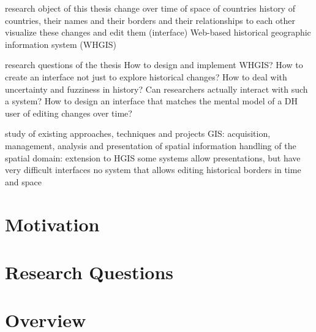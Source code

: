 research object of this thesis
  change over time of space of countries
  history of countries, their names and their borders and their relationships to each other
  visualize these changes and edit them (interface)
  Web-based historical geographic information system (WHGIS)

research questions of the thesis
  How to design and implement WHGIS?
  How to create an interface not just to explore historical changes?
  How to deal with uncertainty and fuzziness in history?
  Can researchers actually interact with such a system?
  How to design an interface that matches the mental model of a DH user of editing changes over time?

study of existing approaches, techniques and projects
  GIS: acquisition, management, analysis and presentation of spatial information
  handling of the spatial domain: extension to HGIS
  some systems allow presentations, but have very difficult interfaces
  no system that allows editing historical borders in time and space



\section{Motivation} %
\label{sec:motivation}




\section{Research Questions} %
\label{sec:research_questions}




\section{Overview} %
\label{sec:overview}




